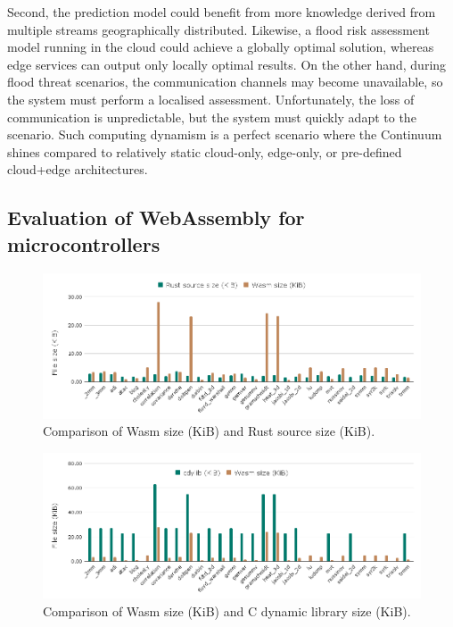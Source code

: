 Second, the prediction model could benefit from more knowledge derived from multiple streams geographically distributed. Likewise, a flood risk assessment model running in the cloud could achieve a globally optimal solution, whereas edge services can output only locally optimal results. On the other hand, during flood threat scenarios, the communication channels may become unavailable, so the system must perform a localised assessment. Unfortunately, the loss of communication is unpredictable, but the system must quickly adapt to the scenario. Such computing dynamism is a perfect scenario where the Continuum shines compared to relatively static cloud-only, edge-only, or pre-defined cloud+edge architectures.

\subsection{Evaluation of WebAssembly for microcontrollers}

\begin{figure}[ht]
\centering
\includegraphics[width=\columnwidth]{figures/b-wasmi-2}
\caption{Comparison of Wasm size (KiB) and Rust source size (KiB).}
\label{fig:b-wasmi-2}
\end{figure}

\begin{figure}[ht]
\centering
\includegraphics[width=\columnwidth]{figures/b-wasmi-3}
\caption{Comparison of Wasm size (KiB) and C dynamic library size (KiB).} \label{fig:b-wasmi-3}
\end{figure}


